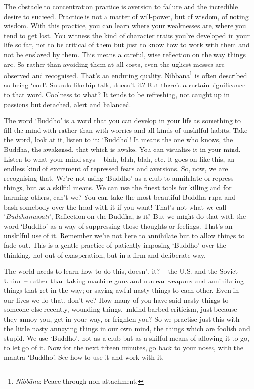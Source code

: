 The obstacle to concentration practice is aversion to failure and the incredible desire to succeed. Practice is not a matter of will-power, but of wisdom, of noting wisdom. With this practice, you can learn where your weaknesses are, where you tend to get lost. You witness the kind of character traits you've developed in your life so far, not to be critical of them but just to know how to work with them and not be enslaved by them. This means a careful, wise reflection on the way things are. So rather than avoiding them at all costs, even the ugliest messes are observed and recognised. That's an enduring quality. Nibb\=ana\footnote{\textit{Nibb\=ana}: Peace through non-attachment.} is often described as being `cool'. Sounds like hip talk, doesn't it? But there's a certain significance to that word. Coolness to what? It tends to be refreshing, not caught up in passions but detached, alert and balanced.

The word `Buddho' is a word that you can develop in your life as something to fill the mind with rather than with worries and all kinds of unskilful habits. Take the word, look at it, listen to it: `Buddho'! It means the one who knows, the Buddha, the awakened, that which is awake. You can visualise it in your mind. Listen to what your mind says -- blah, blah, blah, etc. It goes on like this, an endless kind of excrement of repressed fears and aversions. So, now, we are recognising that. We're not using `Buddho' as a club to annihilate or repress things, but as a skilful means. We can use the finest tools for killing and for harming others, can't we? You can take the most beautiful Buddha rupa and bash somebody over the head with it if you want! That's not what we call `\textit{Buddhanussati}', Reflection on the Buddha, is it? But we might do that with the word `Buddho' as a way of suppressing those thoughts or feelings. That's an unskilful use of it. Remember we're not here to annihilate but to allow things to fade out. This is a gentle practice of patiently imposing `Buddho' over the thinking, not out of exasperation, but in a firm and deliberate way.

The world needs to learn how to do this, doesn't it? -- the U.S. and the Soviet Union -- rather than taking machine guns and nuclear weapons and annihilating things that get in the way; or saying awful nasty things to each other. Even in our lives we do that, don't we? How many of you have said nasty things to someone else recently, wounding things, unkind barbed criticism, just because they annoy you, get in your way, or frighten you? So we practise just this with the little nasty annoying things in our own mind, the things which are foolish and stupid. We use `Buddho', not as a club but as a skilful means of allowing it to go, to let go of it. Now for the next fifteen minutes, go back to your noses, with the mantra `Buddho'. See how to use it and work with it.

